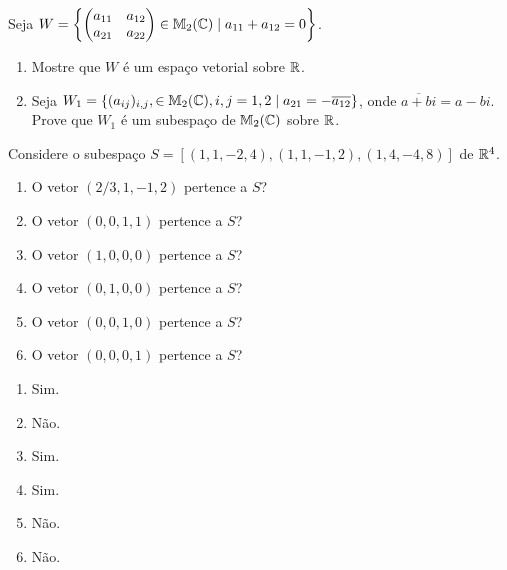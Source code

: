 \documentclass[12pt]{exam}
\begin{document}
\begin{exercicio}
  Seja $W = \left\{\begin{pmatrix} a_{11} & a_{12}\\ a_{21} & a_{22}\end{pmatrix} \in \mathbb{M}_2(\mathbb{C}) \mid a_{11} + a_{12} = 0\right\}$.
  \begin{enumerate}[label={\alph*})]
    \item Mostre que $W$ \'e um espa\c{c}o vetorial sobre $\mathbb{R}$.

    \item Seja $W_1 = \{(a_{ij})_{i,j}, \in \mathbb{M}_2(\mathbb{C}), i, j = 1, 2 \mid a_{21} = -\overline{a_{12}}\}$, onde $\overline{a + bi} = a - bi$. Prove que $W_1$ \'e um subespa\c{c}o de $\mathbb{M}_2(\mathbb{C})$ sobre $\mathbb{R}$.
  \end{enumerate}
\end{exercicio}

\begin{exercicio}
  Considere o subespa\c{c}o $S = [(1,1,-2,4),(1,1,-1,2),(1,4,-4,8)]$ de $\mathbb{R}^4$.
  \begin{enumerate}[label={\alph*})]
    \item O vetor $(2/3, 1, -1, 2)$ pertence a $S$?

    \item O vetor $(0, 0, 1, 1)$ pertence a $S$?

    \item O vetor $(1, 0, 0, 0)$ pertence a $S$?

    \item O vetor $(0, 1, 0, 0)$ pertence a $S$?

    \item O vetor $(0, 0, 1, 0)$ pertence a $S$?

    \item O vetor $(0, 0, 0, 1)$ pertence a $S$?
  \end{enumerate}
  \begin{solucao}
    \begin{multicols}{2}
      \begin{enumerate}[label={\alph*})]
        \item Sim.

        \item N\~ao.

        \item Sim.

        \item Sim.

        \item Não.

        \item Não.
      \end{enumerate}
    \end{multicols}
  \end{solucao}
\end{exercicio}
\end{document}
